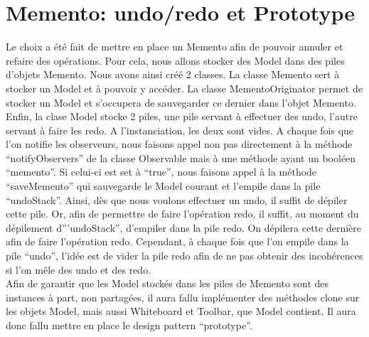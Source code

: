 \chapter{Memento: undo/redo et Prototype}

Le choix a été fait de mettre en place un Memento afin de pouvoir annuler et
refaire des opérations. Pour cela, nous allons stocker des Model
dans des piles d'objets Memento. Nous avons ainsi créé 2 classes. La classe
Memento sert à stocker un Model et à pouvoir y accéder. La classe
MementoOriginator permet de stocker un Model et s'occupera de sauvegarder
ce dernier dans l'objet Memento. Enfin, la clase Model stocke 2 piles, une pile
servant à effectuer des undo, l'autre servant à faire les redo. A l'instanciation, les deux sont vides. A chaque fois que l'on notifie les
observeurs, nous faisons appel non pas directement à la méthode ``notifyObservers'' de la classe Observable mais à une méthode ayant un booléen
``memento''. Si celui-ci est set à ``true'', nous faisons appel à
la méthode ``saveMemento'' qui sauvegarde le Model courant et l'empile dans la pile ``undoStack''. Ainsi, dès que nous voulons effectuer un undo,
il suffit de dépiler cette pile. Or, afin de permettre de faire l'opération redo, il suffit, au moment du dépilement d'''undoStack'', d'empiler dans
la pile redo. On dépilera cette dernière afin de faire l'opération redo. Cependant, à chaque fois que l'on empile dans la pile
``undo'',  l'idée est de vider la pile redo afin de ne pas obtenir des incohérences si l'on mêle des undo et des redo.
\\
Afin de garantir que les Model stockés dans les piles de Memento sont
des instances à part, non partagées, il aura fallu implémenter des méthodes
clone sur les objets Model, mais aussi Whiteboard et Toolbar, que Model contient. Il aura donc fallu mettre en place le design pattern ``prototype''.
